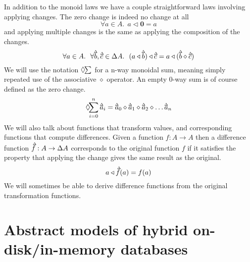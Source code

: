 \documentclass[11pt,a4paper]{article}
\newcommand\deltavar[1]{\accentset{\Delta}{#1}}
\begin{document}
In addition to the monoid laws we have a couple straightforward laws involving
applying changes. The zero change is indeed no change at all
\begin{equation}
  \forall a \in A. ~~ a \triangleleft \mathbf{0} = a
\end{equation}
and applying multiple changes is the same as applying the composition of the
changes.
\begin{equation}
\label{eq:apply-compose}
  \forall a \in A. ~~ \forall \deltavar{b}, \deltavar{c} \in \Delta{A}. ~~
    (a \triangleleft \deltavar{b}) \triangleleft \deltavar{c}
  = a \triangleleft (\deltavar{b} \diamond \deltavar{c})
\end{equation}
We will use the notation $\Diamond\hspace{-3pt}\sum$ for a n-way monoidal sum,
meaning simply repeated use of the associative $\diamond$ operator. An empty
0-way sum is of course defined as the zero change.
\[
\Diamond\hspace{-4pt}\sum_{i=0}^n{\deltavar{a}_i}
= \deltavar{a}_0 \diamond \deltavar{a}_1 \diamond \deltavar{a}_2 \diamond \ldots \deltavar{a}_n
\]
We will also talk about functions that transform values, and corresponding
functions that compute differences. Given a function $f : A \to A$ then a
difference function $\deltavar{f} : A \to \Delta{A}$ corresponds to the
original function $f$ if it satisfies the property that applying the change
gives the same result as the original.
\begin{equation}
  a \triangleleft \deltavar{f}(a) = f(a)
\end{equation}
We will sometimes be able to derive difference functions from the original
transformation functions.


\section{Abstract models of hybrid on-disk/in-memory databases}
\label{abstract-models}
\end{document}
